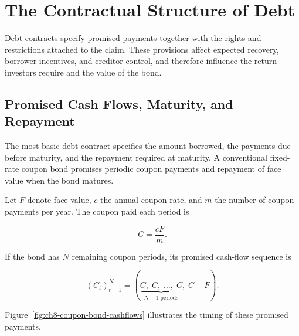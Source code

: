 \section{The Contractual Structure of Debt}

Debt contracts specify promised payments together with the rights and restrictions attached to the claim. These provisions affect expected recovery, borrower incentives, and creditor control, and therefore influence the return investors require and the value of the bond.

\subsection{Promised Cash Flows, Maturity, and Repayment}

The most basic debt contract specifies the amount borrowed, the payments due before maturity, and the repayment required at maturity. A conventional fixed-rate coupon bond promises periodic coupon payments and repayment of face value when the bond matures.

Let $F$ denote face value, $c$ the annual coupon rate, and $m$ the number of coupon payments per year. The coupon paid each period is

\begin{equation*}
C=\frac{cF}{m}.
\label{eq:ch8-coupon-payment}
\end{equation*}

If the bond has $N$ remaining coupon periods, its promised cash-flow sequence is

\begin{equation*}
(C_t)_{t=1}^N
=
(\underbrace{C,\; C,\; \ldots,\; C}_{N-1\text{ periods}},\; C+F).
\label{eq:ch8-promised-cash-flow-sequence}
\end{equation*}

Figure~\ref{fig:ch8-coupon-bond-cashflows}
illustrates the timing of these promised payments.

